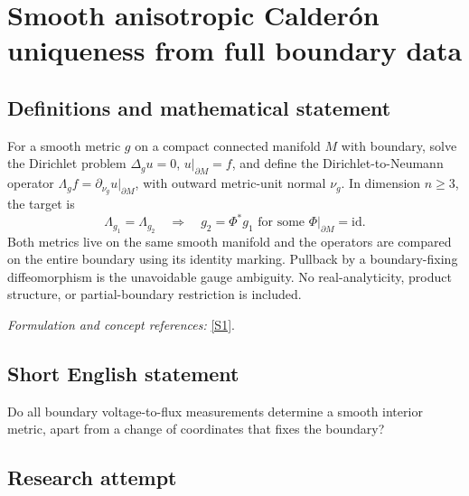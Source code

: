 \documentclass[11pt,a4paper]{article}
\newcommand{\sref}[2]{\hyperlink{source:#1:#2}{[S#2]}}
\newif\ifshowcatalogue
\newcommand{\cataloguescope}[1]{\ifshowcatalogue
 \paragraph{Exact scope in the supplied catalogue.}
 \begin{quote}\small #1\end{quote}\fi}
\numberwithin{equation}{section}
\begin{document}
\setcounter{section}{0}
\clearpage
\section*{\texorpdfstring{Smooth anisotropic Calderón uniqueness from full boundary data}{Smooth anisotropic Calderón uniqueness from full boundary data}}\label{statement}
\subsection{Definitions and mathematical statement}
For a smooth metric $g$ on a compact connected manifold $M$ with boundary, solve the Dirichlet problem $\Delta_g u=0$, $u|_{\partial M}=f$, and define the Dirichlet-to-Neumann operator
$\Lambda_g f=\partial_{\nu_g}u|_{\partial M}$, with outward metric-unit normal $\nu_g$. In dimension $n\ge3$, the target is
\[
 \Lambda_{g_1}=\Lambda_{g_2}\quad\Longrightarrow\quad
 g_2=\Phi^*g_1\text{ for some }\Phi|_{\partial M}=\mathrm{id}.
\]
Both metrics live on the same smooth manifold and the operators are compared on the entire boundary using its identity marking. Pullback by a boundary-fixing diffeomorphism is the unavoidable gauge ambiguity. No real-analyticity, product structure, or partial-boundary restriction is included.
\par\smallskip\textit{Formulation and concept references:} \sref{statement}{1}.
\cataloguescope{For every compact connected smooth manifold M of dimension n>=3 with smooth nonempty boundary and every pair of smooth Riemannian metrics g1,g2 on that same M, let Lambda\_gj f be the outward metric-unit normal derivative of the unique solution of Delta\_gj u=0 with u|boundary=f. If Lambda\_g1=Lambda\_g2 as operators C-infinity(boundary M) to C-infinity(boundary M), compared under the identity marking on the whole boundary, must there be a smooth diffeomorphism Phi:M->M fixing the boundary pointwise with g2=Phi\textasciicircum{}*g1?}
\subsection{Short English statement}
Do all boundary voltage-to-flux measurements determine a smooth interior metric, apart from a change of coordinates that fixes the boundary?
\subsection{Research attempt}
\end{document}

